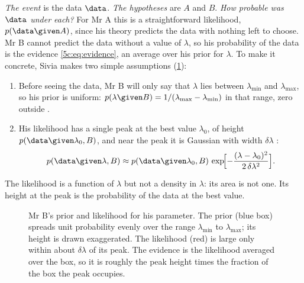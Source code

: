 \emph{The event} is the data $\data$. \emph{The hypotheses} are $A$ and $B$.
\emph{How probable was $\data$ under each?} For Mr A this is a straightforward
likelihood, $p(\data\given A)$, since his theory predicts the data with nothing left
to choose. Mr B cannot predict the data without a value of $\lambda$, so his
probability of the data is the evidence \eqref{5c:eq:evidence}, an average over his
prior for $\lambda$. To make it concrete, Sivia makes two simple assumptions
(\cref{5c:fig:mrb}):
\begin{enumerate}[itemsep=1pt,leftmargin=1.6em]
  \item Before seeing the data, Mr B will only say that $\lambda$ lies between
        $\lambda_{\min}$ and $\lambda_{\max}$, so his prior is uniform:
        $p(\lambda\given B)=1/(\lambda_{\max}-\lambda_{\min})$ in that range, zero
        outside .
  \item His likelihood has a single peak at the best value $\lambda_0$, of height
        $p(\data\given\lambda_0,B)$, and near the peak it is Gaussian with width
        $\delta\lambda$ :
        \[
          p(\data\given\lambda,B)\approx p(\data\given\lambda_0,B)\,
          \exp\!\Bigl[-\frac{(\lambda-\lambda_0)^2}{2\,\delta\lambda^2}\Bigr].
        \]
\end{enumerate}
The likelihood is a function of $\lambda$ but not a density in $\lambda$: its area is
not one. Its height at the peak is the probability of the data at the best value.

\begin{figure}[htbp]
\centering
{}
\caption{Mr B's prior and likelihood for his parameter. The prior (blue box) spreads
unit probability evenly over the range $\lambda_{\min}$ to $\lambda_{\max}$; its height
is drawn exaggerated. The likelihood (red) is large only within about $\delta\lambda$ of
its peak. The evidence is the likelihood averaged over the box, so it is roughly the
peak height times the fraction of the box the peak occupies.}
\label{5c:fig:mrb}
\end{figure}


